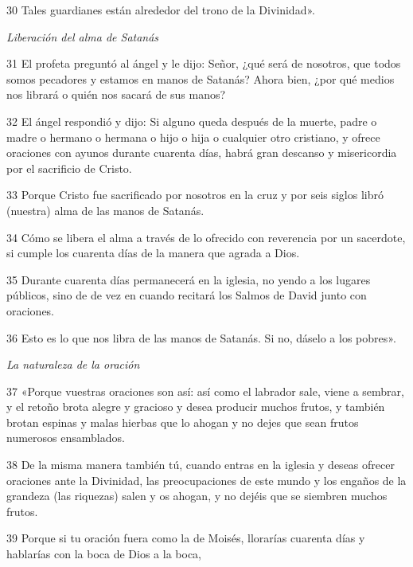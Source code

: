 \par 30 Tales guardianes están alrededor del trono de la Divinidad».

\par \textit{Liberación del alma de Satanás}

\par 31 El profeta preguntó al ángel y le dijo: Señor, ¿qué será de nosotros, que todos somos pecadores y estamos en manos de Satanás? Ahora bien, ¿por qué medios nos librará o quién nos sacará de sus manos?

\par 32 El ángel respondió y dijo: Si alguno queda después de la muerte, padre o madre o hermano o hermana o hijo o hija o cualquier otro cristiano, y ofrece oraciones con ayunos durante cuarenta días, habrá gran descanso y misericordia por el sacrificio de Cristo.

\par 33 Porque Cristo fue sacrificado por nosotros en la cruz y por seis siglos libró (nuestra) alma de las manos de Satanás.

\par 34 Cómo se libera el alma a través de lo ofrecido con reverencia por un sacerdote, si cumple los cuarenta días de la manera que agrada a Dios.

\par 35 Durante cuarenta días permanecerá en la iglesia, no yendo a los lugares públicos, sino de de vez en cuando recitará los Salmos de David junto con oraciones.

\par 36 Esto es lo que nos libra de las manos de Satanás. Si no, dáselo a los pobres».

\par \textit{La naturaleza de la oración}

\par 37 «Porque vuestras oraciones son así: así como el labrador sale, viene a sembrar, y el retoño brota alegre y gracioso y desea producir muchos frutos, y también brotan espinas y malas hierbas que lo ahogan y no dejes que sean frutos numerosos ensamblados.

\par 38 De la misma manera también tú, cuando entras en la iglesia y deseas ofrecer oraciones ante la Divinidad, las preocupaciones de este mundo y los engaños de la grandeza (las riquezas) salen y os ahogan, y no dejéis que se siembren muchos frutos.

\par 39 Porque si tu oración fuera como la de Moisés, llorarías cuarenta días y hablarías con la boca de Dios a la boca,



